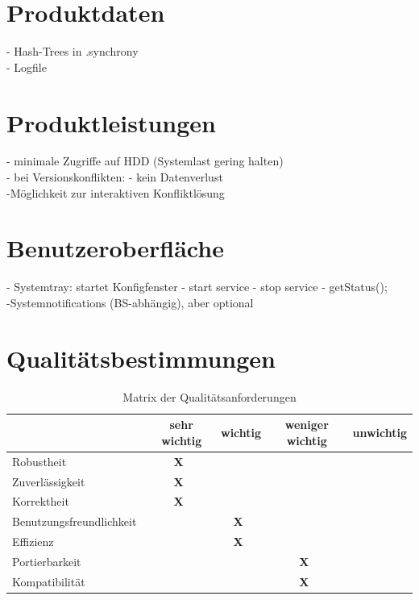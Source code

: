 \documentclass[12pt,oneside,a4paper,bibtotoc,liststotoc,pointlessnumbers]{scrartcl}
\begin{document}
\newpage
\section{Produktdaten}
- Hash-Trees in .synchrony\\
- Logfile
\newpage
\section{Produktleistungen}
- minimale Zugriffe auf HDD (Systemlast gering halten)\\
- bei Versionskonflikten: - kein Datenverlust\\-Möglichkeit zur interaktiven Konfliktlösung
\newpage
\section{Benutzeroberfläche}
- Systemtray: startet Konfigfenster - start service - stop service - getStatus();\\
-Systemnotifications (BS-abhängig), aber optional
\newpage
\section{Qualitätsbestimmungen}

\begin{table}[h]							
\begin{center}
 \begin{tabular}{l|c|c|c|c}
  ~ & sehr wichtig & wichtig & weniger wichtig & unwichtig\\
  \hline \hline
  Robustheit~ & \textbf{X}~ &  ~ ~ ~ &  ~ ~ ~ &  ~ ~ ~ \\
  \hline
  Zuverlässigkeit~ & \textbf{X}~ &  ~ ~ ~ &  ~ ~ ~ &  ~ ~ ~ \\
  \hline
  Korrektheit~ & \textbf{X}~ &  ~ ~ ~ &  ~ ~ ~ &  ~ ~ ~ \\
  \hline
  Benutzungsfreundlichkeit~ &  ~ ~ ~ & \textbf{X}~ &  ~ ~ ~ &  ~ ~ ~ \\
  \hline
  Effizienz~ &  ~ ~ ~ & \textbf{X}~ &  ~ ~ ~ &  ~ ~ ~ \\
  \hline
  Portierbarkeit~ &  ~ ~ ~ &  ~ ~ ~ & \textbf{X}~ &  ~ ~ ~ \\
  \hline
  Kompatibilität~ &  ~ ~ ~ &  ~ ~ ~ & \textbf{X}~ &  ~ ~ ~ \\
 \end{tabular}
\end{center}
\caption{Matrix der Qualitätsanforderungen}									%
\label{fig:LogoGD}												%
\end{table}
\end{document}
